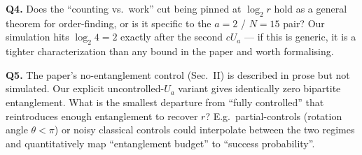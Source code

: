 \documentclass[11pt]{article}
\begin{document}
\textbf{Q4.} Does the ``counting vs.\ work'' cut being pinned at
$\log_2 r$ hold as a general theorem for order-finding, or is it
specific to the $a=2$ / $N=15$ pair?  Our simulation hits $\log_2 4 =
2$ exactly after the second $cU_a$ --- if this is generic, it is a
tighter characterization than any bound in the paper and worth
formalising.

\textbf{Q5.} The paper's no-entanglement control (Sec.~II)  is
described in prose but not simulated.  Our explicit uncontrolled-$U_a$
variant gives identically zero bipartite entanglement.  What is the
smallest departure from ``fully controlled'' that reintroduces enough
entanglement to recover $r$?  E.g.\ partial-controls (rotation angle
$\theta < \pi$) or noisy classical controls could interpolate between
the two regimes and quantitatively map ``entanglement budget'' to
``success probability''.
\end{document}
